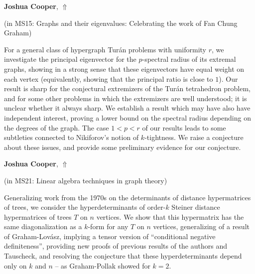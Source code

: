 \documentclass[ILAS2025-program.tex]{subfiles}
\begin{document}
\hypertarget{down0029}{}\begin{ilasabstract}
    
\textbf{Joshua Cooper},  \hfill \hyperlink{up0029}{$\Uparrow$}
    
    
(in {\color{mstitle}MS15: Graphs and their eigenvalues: Celebrating the work of Fan Chung Graham})
        
\mtskip
    For a general class of hypergraph Tur\'{a}n problems with uniformity $r$, we investigate the principal eigenvector for the $p$-spectral radius of its extremal graphs, showing in a strong sense that these eigenvectors have equal weight on each vertex (equivalently, showing that the principal ratio is close to $1$). Our result is sharp for the conjectural extremizers of the Tur\'{a}n tetrahedron problem, and for some other problems in which the extremizers are well understood; it is unclear whether it always sharp. We establish a result which may have also have independent interest, proving a lower bound on the spectral radius depending on the degrees of the graph. The case $1 < p < r$ of our results leads to some subtleties connected to Nikiforov's notion of $k$-tightness. We raise a conjecture about these issues, and provide some preliminary evidence for our conjecture.

\end{ilasabstract}
    

\hypertarget{down0379}{}\begin{ilasabstract}
    
\textbf{Joshua Cooper},  \hfill \hyperlink{up0379}{$\Uparrow$}
    
    
(in {\color{mstitle}MS21: Linear algebra techniques in graph theory})
        
\mtskip
    Generalizing work from the 1970s on the determinants of distance hypermatrices of trees, we consider the hyperdeterminants of order-$k$ Steiner distance hypermatrices of trees $T$ on $n$ vertices.  We show that this hypermatrix has the same diagonalization as a $k$-form for any $T$ on $n$ vertices, generalizing of a result of Graham-Lov\'{a}sz, implying a tensor version of ``conditional negative definiteness'', providing new proofs of previous results of the authors and Tauscheck, and resolving the conjecture that these hyperdeterminants depend only on $k$ and $n$ -- as Graham-Pollak showed for $k=2$.

\end{ilasabstract}
    
\end{document}
